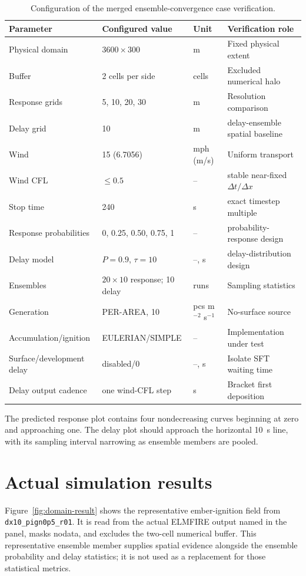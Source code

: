 \begin{table}[htbp]
\centering\small
\begin{tabular}{p{}p{}p{}p{}}
\toprule
Parameter & Configured value & Unit & Verification role \\
\midrule
Physical domain & $3600\times300$ & m & Fixed physical extent \\
Buffer & 2 cells per side & cells & Excluded numerical halo \\
Response grids & 5, 10, 20, 30 & m & Resolution comparison \\
Delay grid & 10 & m & delay-ensemble spatial baseline \\
Wind & 15 (6.7056) & mph (m/s) & Uniform transport \\
Wind CFL & $\leq0.5$ & -- & stable near-fixed $\Delta t/\Delta x$ \\
Stop time & 240 & s & exact timestep multiple \\
Response probabilities & 0, 0.25, 0.50, 0.75, 1 & -- & probability-response design \\
Delay model & $P=0.9$, $\tau=10$ & --, s & delay-distribution design \\
Ensembles & $20\times10$ response; 10 delay & runs & Sampling statistics \\
Generation & PER-AREA, 10 & pcs m$^{-2}$ s$^{-1}$ & No-surface source \\
Accumulation/ignition & EULERIAN/SIMPLE & -- & Implementation under test \\
Surface/development delay & disabled/0 & --, s & Isolate SFT waiting time \\
Delay output cadence & one wind-CFL step & s & Bracket first deposition \\
\bottomrule
\end{tabular}
\caption{Configuration of the merged ensemble-convergence case verification.}
\end{table}

The predicted response plot contains four nondecreasing curves beginning at zero
and approaching one. The delay plot should approach the horizontal 10~s line,
with its sampling interval narrowing as ensemble members are pooled.

\section{Actual simulation results}

Figure~\ref{fig:domain-result} shows the representative ember-ignition field from \texttt{dx10\_pign0p5\_r01}.
It is read from the actual ELMFIRE output named in the panel, masks nodata, and excludes
the two-cell numerical buffer.  This representative ensemble member supplies spatial evidence alongside the ensemble probability and delay statistics; it is not used as a replacement for those statistical metrics.


